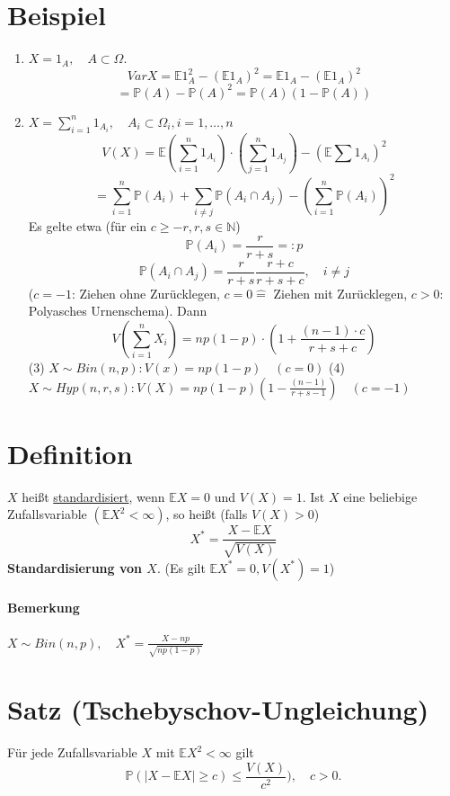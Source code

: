 \documentclass[a4paper,11pt,notitlepage]{report}
\newcommand{\N}{{\ensuremath{\mathbb{N}}}}
\newcommand{\Prim}{{\ensuremath{\mathbb{P}}}}
\newcommand{\E}{{\ensuremath{\mathbb{E}}}}
\begin{document}
\section{Beispiel}
\begin{enumerate}
	\item $X = 1_A, \quad A \subset \Omega$.
		$$Var X = \E 1_A^2 - (\E 1_A)^2 = \E 1_A - (\E 1_A)^2$$
		$$= \Prim(A)-\Prim(A)^2 = \Prim(A) (1 - \Prim(A))$$
	\item $X= \sum\limits_{i=1}^n{1_{A_i}}, \quad A_i \subset \Omega_i, i=1, \ldots, n$
		$$V(X) = \E \left(\sum\limits_{i=1}^n{1_{A_i}}\right) \cdot \left(\sum\limits_{j=1}^n{1_{A_j}}\right) - (\E \sum{1_{A_i}})^2$$
		$$ = \sum\limits_{i=1}^n{\Prim(A_i)} + \sum\limits_{i \neq j}{\Prim(A_i \cap A_j)} - (\sum\limits_{i=1}^n{\Prim(A_i)})^2$$
		Es gelte etwa (für ein $c \geq -r, r, s \in \N$)
		$$\Prim(A_i) = \frac{r}{r+s} =: p$$
		$$\Prim(A_i \cap A_j) = \frac{r}{r+s} \frac{r+c}{r+s+c}, \quad i \neq j$$
		($c=-1$: Ziehen ohne Zurücklegen, $c=0 \hat{=}$ Ziehen mit Zurücklegen, $c>0$: Polyasches Urnenschema). Dann
		$$V\left(\sum\limits_{i=1}^n{X_i}\right) = n p (1-p) \cdot \left(1 + \frac{(n-1) \cdot c}{r+s+c}\right)$$
		(3) $X \sim Bin(n,p): V(x) = n p (1-p) \quad (c=0)$ \newline
		(4) $X \sim Hyp (n,r,s): V(X) = n p (1-p) \left(1 - \frac{(n-1)}{r+s-1}\right) \quad (c=-1)$
\end{enumerate}

\section{Definition}
$X$ heißt \underline{standardisiert}, wenn $\E X = 0$ und $V(X)=1$. Ist $X$ eine beliebige Zufallsvariable $( \E X^2 < \infty)$, so heißt (falls $V(X)>0$)
$$X^* = \frac{X - \E X}{\sqrt{V(X)}}$$
\textbf{Standardisierung von $X$}. (Es gilt $\E X^* = 0, V(X^*) = 1$)

\paragraph{Bemerkung}
$X \sim Bin(n,p),\quad X^* = \frac{X-np}{\sqrt{n p (1-p)}}$

\section{Satz (Tschebyschov-Ungleichung)}
Für jede Zufallsvariable $X$ mit $\E X^2 < \infty$ gilt
$$\Prim(|X-\E X| \geq c) \leq \frac{V(X)}{c^2}), \quad c > 0.$$
\end{document}
